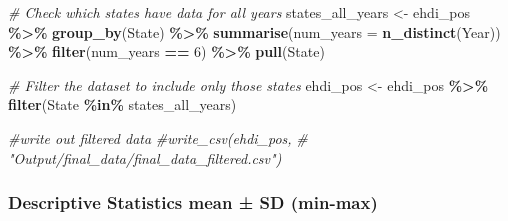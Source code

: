 \documentclass[
]{article}
\newenvironment{Shaded}{\begin{snugshade}}{\end{snugshade}}
\newcommand{\AttributeTok}[1]{\textcolor[rgb]{0.13,0.29,0.53}{#1}}
\newcommand{\CommentTok}[1]{\textcolor[rgb]{0.56,0.35,0.01}{\textit{#1}}}
\newcommand{\DecValTok}[1]{\textcolor[rgb]{0.00,0.00,0.81}{#1}}
\newcommand{\FunctionTok}[1]{\textcolor[rgb]{0.13,0.29,0.53}{\textbf{#1}}}
\newcommand{\NormalTok}[1]{#1}
\newcommand{\OtherTok}[1]{\textcolor[rgb]{0.56,0.35,0.01}{#1}}
\newcommand{\SpecialCharTok}[1]{\textcolor[rgb]{0.81,0.36,0.00}{\textbf{#1}}}
\begin{document}
\begin{Shaded}
\begin{Highlighting}[]
\CommentTok{\# Check which states have data for all years}
\NormalTok{states\_all\_years }\OtherTok{\textless{}{-}}\NormalTok{ ehdi\_pos }\SpecialCharTok{\%\textgreater{}\%}
  \FunctionTok{group\_by}\NormalTok{(State) }\SpecialCharTok{\%\textgreater{}\%}
  \FunctionTok{summarise}\NormalTok{(}\AttributeTok{num\_years =} \FunctionTok{n\_distinct}\NormalTok{(Year)) }\SpecialCharTok{\%\textgreater{}\%}
  \FunctionTok{filter}\NormalTok{(num\_years }\SpecialCharTok{==} \DecValTok{6}\NormalTok{) }\SpecialCharTok{\%\textgreater{}\%}
  \FunctionTok{pull}\NormalTok{(State)}

\CommentTok{\# Filter the dataset to include only those states}
\NormalTok{ehdi\_pos }\OtherTok{\textless{}{-}}\NormalTok{ ehdi\_pos }\SpecialCharTok{\%\textgreater{}\%}
  \FunctionTok{filter}\NormalTok{(State }\SpecialCharTok{\%in\%}\NormalTok{ states\_all\_years)}

\CommentTok{\#write out filtered data}
\CommentTok{\#write\_csv(ehdi\_pos,}
\CommentTok{\#          "Output/final\_data/final\_data\_filtered.csv")}
\end{Highlighting}
\end{Shaded}

\hypertarget{descriptive-statistics-mean-sd-min-max}{%
\subsubsection{Descriptive Statistics mean ± SD
(min-max)}\label{descriptive-statistics-mean-sd-min-max}}
\end{document}
